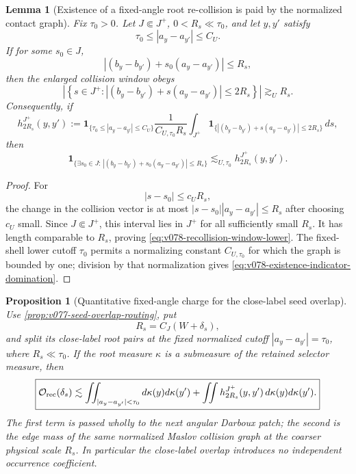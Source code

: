 \documentclass[10pt]{article}
\newtheorem{proposition}[theorem]{Proposition}
\newtheorem{lemma}[theorem]{Lemma}
\begin{document}
\begin{lemma}[Existence of a fixed-angle root re-collision is paid by the normalized contact graph]
\label{lem:v078-recollision-existence-to-graph}
Fix \(\tau_0>0\).  Let \(J\Subset J^+\), \(0<R_s\ll\tau_0\), and let \(y,y'\) satisfy
\[
\tau_0\le|a_y-a_{y'}|\le C_U.
\]
If for some \(s_0\in J\),
\[
|(b_y-b_{y'})+s_0(a_y-a_{y'})|\le R_s,
\]
then the enlarged collision window obeys
\begin{equation}
\label{eq:v078-recollision-window-lower}
\left|
\left\{
s\in J^+:
|(b_y-b_{y'})+s(a_y-a_{y'})|\le2R_s
\right\}
\right|
\gtrsim_U R_s.
\end{equation}
Consequently, if
\[
h_{2R_s}^{J^+}(y,y')
:=
\mathbf 1_{\{\tau_0\le|a_y-a_{y'}|\le C_U\}}
\frac1{C_{U,\tau_0}R_s}
\int_{J^+}
\mathbf 1_{\{|(b_y-b_{y'})+s(a_y-a_{y'})|\le2R_s\}}\,ds,
\]
then
\begin{equation}
\label{eq:v078-existence-indicator-domination}
\boxed{
\mathbf 1_{\{\exists s_0\in J:\,
|(b_y-b_{y'})+s_0(a_y-a_{y'})|\le R_s\}}
\lesssim_{U,\tau_0}
h_{2R_s}^{J^+}(y,y').
}
\end{equation}
\end{lemma}

\begin{proof}
For
\[
|s-s_0|\le c_UR_s,
\]
the change in the collision vector is at most
\(|s-s_0||a_y-a_{y'}|\le R_s\) after choosing \(c_U\) small.  Since \(J\Subset J^+\), this interval
lies in \(J^+\) for all sufficiently small \(R_s\).  It has length comparable to \(R_s\), proving
\eqref{eq:v078-recollision-window-lower}.  The fixed-shell lower cutoff \(\tau_0\) permits a
normalizing constant \(C_{U,\tau_0}\) for which the graph is bounded by one; division by that
normalization gives \eqref{eq:v078-existence-indicator-domination}.
\end{proof}

\begin{proposition}[Quantitative fixed-angle charge for the close-label seed overlap]
\label{prop:v078-close-overlap-charge}
Use \cref{prop:v077-seed-overlap-routing}, put
\[
R_s=C_J(W+\delta_s),
\]
and split its close-label root pairs at the fixed normalized cutoff
\(|a_y-a_{y'}|=\tau_0\), where \(R_s\ll\tau_0\).  If the root measure
\(\kappa\) is a submeasure of the retained selector measure, then
\begin{equation}
\label{eq:v078-close-overlap-fixed-angular}
\boxed{
\mathcal O_{\rm rec}(\delta_s)
\lesssim
\iint_{|a_y-a_{y'}|<\tau_0}d\kappa(y)d\kappa(y')
+
\iint h_{2R_s}^{J^+}(y,y')\,d\kappa(y)d\kappa(y').
}
\end{equation}
The first term is passed wholly to the next angular Darboux patch; the second is the edge mass of
the same normalized Maslov collision graph at the coarser physical scale \(R_s\).  In particular
the close-label overlap introduces no independent occurrence coefficient.
\end{proposition}
\end{document}

